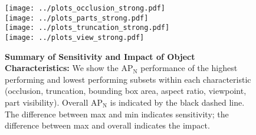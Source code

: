 \documentclass[11pt,letterpaper]{article}
\newcommand{\mrm}[1]{\mathrm{#1}}
\def\apn{AP$\mrm{_N}$ }
\begin{document}
\begin{figure}
\begin{center}
\texttt{[image: ../plots\_occlusion\_strong.pdf]} \\
\texttt{[image: ../plots\_parts\_strong.pdf]} \\
\texttt{[image: ../plots\_truncation\_strong.pdf]} \\
\texttt{[image: ../plots\_view\_strong.pdf]} \\
\end{center}
\caption{
\textbf{Summary of Sensitivity and Impact of Object Characteristics: } We show the \apn performance of the highest performing and lowest performing subsets within each characteristic (occlusion, truncation, bounding box area, aspect ratio, viewpoint, part visibility).  Overall \apn is indicated by the black dashed line.  The difference between max and min indicates sensitivity; the difference between max and overall indicates the impact.
}
\end{figure}
\end{document}
